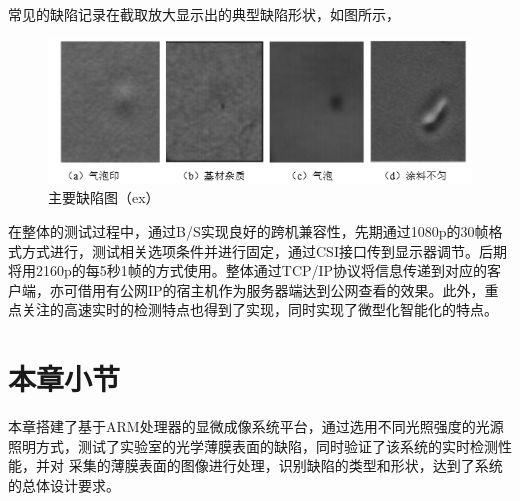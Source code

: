 常见的缺陷记录在截取放大显示出的典型缺陷形状，如图所示，
\begin{figure}[h]
\centering
\includegraphics[width=0.7\linewidth]{Figure/ex_2}
\caption{主要缺陷图（ex）}
\label{fig:ex_2}
\end{figure}

在整体的测试过程中，通过B/S实现良好的跨机兼容性，先期通过1080p的30帧格式方式进行，测试相关选项条件并进行固定，通过CSI接口传到显示器调节。后期将用2160p的每5秒1帧的方式使用。整体通过TCP/IP协议将信息传递到对应的客户端，亦可借用有公网IP的宿主机作为服务器端达到公网查看的效果。此外，重点关注的高速实时的检测特点也得到了实现，同时实现了微型化智能化的特点。

\section{本章小节}
本章搭建了基于ARM处理器的显微成像系统平台，通过选用不同光照强度的光源照明方式，测试了实验室的光学薄膜表面的缺陷，同时验证了该系统的实时检测性能，并对 采集的薄膜表面的图像进行处理，识别缺陷的类型和形状，达到了系统的总体设计要求。
